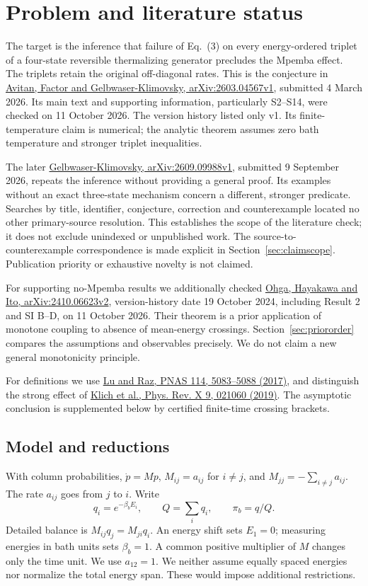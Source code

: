 \documentclass[11pt]{article}
\begin{document}
\section{Problem and literature status}
The target is the inference that failure of Eq.~(3) on every energy-ordered triplet of a four-state reversible thermalizing generator precludes the Mpemba effect. The triplets retain the original off-diagonal rates. This is the conjecture in \href{https://arxiv.org/html/2603.04567v1}{Avitan, Factor and Gelbwaser-Klimovsky, arXiv:2603.04567v1}, submitted 4 March 2026. Its main text and supporting information, particularly S2--S14, were checked on 11 October 2026. The version history listed only v1. Its finite-temperature claim is numerical; the analytic theorem assumes zero bath temperature and stronger triplet inequalities.

The later \href{https://arxiv.org/html/2609.09988v1}{Gelbwaser-Klimovsky, arXiv:2609.09988v1}, submitted 9 September 2026, repeats the inference without providing a general proof. Its examples without an exact three-state mechanism concern a different, stronger predicate. Searches by title, identifier, conjecture, correction and counterexample located no other primary-source resolution. This establishes the scope of the literature check; it does not exclude unindexed or unpublished work. The source-to-counterexample correspondence is made explicit in Section~\ref{sec:claimscope}. Publication priority or exhaustive novelty is not claimed.

For supporting no-Mpemba results we additionally checked \href{https://arxiv.org/html/2410.06623v2}{Ohga, Hayakawa and Ito, arXiv:2410.06623v2}, version-history date 19 October 2024, including Result 2 and SI B--D, on 11 October 2026. Their theorem is a prior application of monotone coupling to absence of mean-energy crossings. Section~\ref{sec:priororder} compares the assumptions and observables precisely. We do not claim a new general monotonicity principle.

For definitions we use \href{https://pmc.ncbi.nlm.nih.gov/articles/PMC5441807/}{Lu and Raz, PNAS 114, 5083--5088 (2017)}, and distinguish the strong effect of \href{https://arxiv.org/abs/1711.05829}{Klich et al., Phys. Rev. X 9, 021060 (2019)}. The asymptotic conclusion is supplemented below by certified finite-time crossing brackets.

\subsection{Model and reductions}
With column probabilities, $\dot p=Mp$, $M_{ij}=a_{ij}$ for $i\ne j$, and $M_{jj}=-\sum_{i\ne j}a_{ij}$. The rate $a_{ij}$ goes from $j$ to $i$. Write
\[
q_i=e^{-\beta_b E_i},\qquad Q=\sum_iq_i,\qquad \pi_b=q/Q.
\]
Detailed balance is $M_{ij}q_j=M_{ji}q_i$. An energy shift sets $E_1=0$; measuring energies in bath units sets $\beta_b=1$. A common positive multiplier of $M$ changes only the time unit. We use $a_{12}=1$. We neither assume equally spaced energies nor normalize the total energy span. These would impose additional restrictions.
\end{document}
